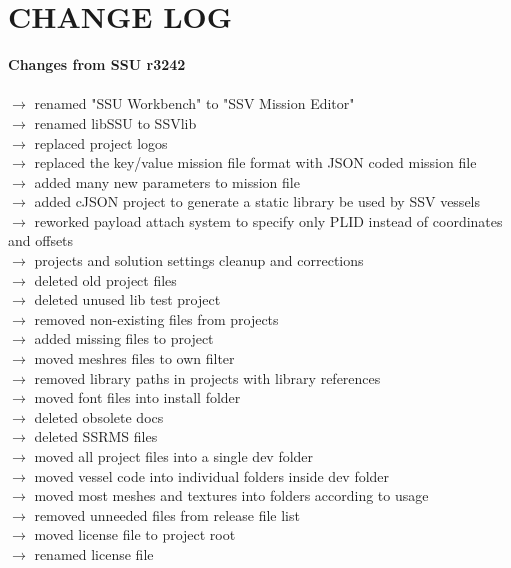 \documentclass[Space_Shuttle_Vessel_Manual.tex]{subfiles}
\begin{document}
\section{CHANGE LOG}
\label{sec:change-log}
\noindent
\textbf{Changes from SSU r3242}\\\\
$\rightarrow$ renamed "SSU Workbench" to "SSV Mission Editor"\\
$\rightarrow$ renamed libSSU to SSVlib\\
$\rightarrow$ replaced project logos\\
$\rightarrow$ replaced the key/value mission file format with JSON coded mission file\\
$\rightarrow$ added many new parameters to mission file\\
$\rightarrow$ added cJSON project to generate a static library be used by SSV vessels\\
$\rightarrow$ reworked payload attach system to specify only PLID instead of coordinates and offsets\\
$\rightarrow$ projects and solution settings cleanup and corrections\\
$\rightarrow$ deleted old project files\\
$\rightarrow$ deleted unused lib test project\\
$\rightarrow$ removed non-existing files from projects\\
$\rightarrow$ added missing files to project\\
$\rightarrow$ moved meshres files to own filter\\
$\rightarrow$ removed library paths in projects with library references\\
$\rightarrow$ moved font files into install folder\\
$\rightarrow$ deleted obsolete docs\\
$\rightarrow$ deleted SSRMS files\\
$\rightarrow$ moved all project files into a single dev folder\\
$\rightarrow$ moved vessel code into individual folders inside dev folder\\
$\rightarrow$ moved most meshes and textures into folders according to usage\\
$\rightarrow$ removed unneeded files from release file list\\
$\rightarrow$ moved license file to project root\\
$\rightarrow$ renamed license file\\
\end{document}

